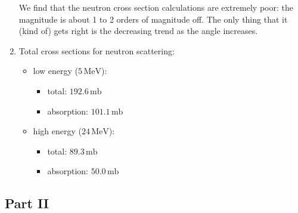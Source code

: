 \documentclass[fleqn, 12pt]{article}
\begin{document}
\begin{enumerate}
  We find that the neutron cross section calculations are extremely poor: the
  magnitude is about 1 to 2 orders of magnitude off.  The only thing that it
  (kind of) gets right is the decreasing trend as the angle increases.

\item Total cross sections for neutron scattering:

  \begin{itemize}
  \item low energy ($5\,\mathrm{MeV}$):
    \begin{itemize}
    \item total: $192.6\,\mathrm{mb}$
    \item absorption: $101.1\,\mathrm{mb}$
    \end{itemize}

  \item high energy ($24\,\mathrm{MeV}$):
    \begin{itemize}
    \item total: $89.3\,\mathrm{mb}$
    \item absorption: $50.0\,\mathrm{mb}$
    \end{itemize}
  \end{itemize}

\end{enumerate}

\subsection*{Part II}
\end{document}
